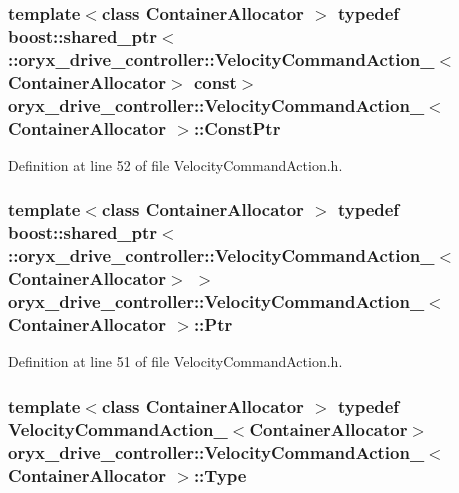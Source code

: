 \subsubsection[{\-Const\-Ptr}]{\setlength{\rightskip}{0pt plus 5cm}template$<$class Container\-Allocator $>$ typedef boost\-::shared\-\_\-ptr$<$ \-::{\bf oryx\-\_\-drive\-\_\-controller\-::\-Velocity\-Command\-Action\-\_\-}$<$\-Container\-Allocator$>$ const$>$ {\bf oryx\-\_\-drive\-\_\-controller\-::\-Velocity\-Command\-Action\-\_\-}$<$ \-Container\-Allocator $>$\-::{\bf \-Const\-Ptr}}\label{structoryx__drive__controller_1_1VelocityCommandAction___aa3285fafe38ba2c5b9e7e9d77e246549}


\-Definition at line 52 of file \-Velocity\-Command\-Action.\-h.

\subsubsection[{\-Ptr}]{\setlength{\rightskip}{0pt plus 5cm}template$<$class Container\-Allocator $>$ typedef boost\-::shared\-\_\-ptr$<$ \-::{\bf oryx\-\_\-drive\-\_\-controller\-::\-Velocity\-Command\-Action\-\_\-}$<$\-Container\-Allocator$>$ $>$ {\bf oryx\-\_\-drive\-\_\-controller\-::\-Velocity\-Command\-Action\-\_\-}$<$ \-Container\-Allocator $>$\-::{\bf \-Ptr}}\label{structoryx__drive__controller_1_1VelocityCommandAction___a272d6fab116df9aeb521ecff5d48dce5}


\-Definition at line 51 of file \-Velocity\-Command\-Action.\-h.

\subsubsection[{\-Type}]{\setlength{\rightskip}{0pt plus 5cm}template$<$class Container\-Allocator $>$ typedef {\bf \-Velocity\-Command\-Action\-\_\-}$<$\-Container\-Allocator$>$ {\bf oryx\-\_\-drive\-\_\-controller\-::\-Velocity\-Command\-Action\-\_\-}$<$ \-Container\-Allocator $>$\-::{\bf \-Type}}\label{structoryx__drive__controller_1_1VelocityCommandAction___a25b2be9936c92f3d1e795c366e7b6535}


